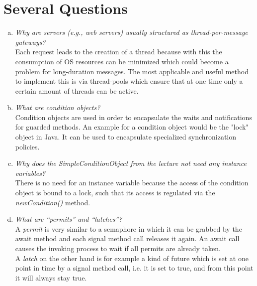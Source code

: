 \documentclass{report}
\author{Marcel \textsc{Zauder} 16-124-836 \\
	Pascal \textsc{Gerig} 16-104-721}
\begin{document}
	\section{Several Questions}
	\startsection
		\begin{enumerate}[a)]
			\item \textit{Why are servers (e.g., web servers) usually structured as thread-per-message gateways?} \\
			Each request leads to the creation of a thread because with this the consumption of OS resources can be minimized which could become a problem for long-duration messages. The most applicable and useful method to implement this is via thread-pools which ensure that at one time only a certain amount of threads can be active.
			\item \textit{What are condition objects?} \\
			Condition objects are used in order to encapsulate the waits and notifications for guarded methods. An example for a condition object would be the "lock" object in Java. It can be used to encapsulate specialized synchronization policies.
			\item \textit{Why does the SimpleConditionObject from the lecture not need any instance variables?} \\
			There is no need for an instance variable because the access of the condition object is bound to a lock, such that its access is regulated via the \textit{newCondition()} method.
			\item \textit{What are “permits” and “latches”?} \\
			A \textit{permit} is very similar to a semaphore in which it can be grabbed by the await method and each signal method call releases it again. An await call causes the invoking process to wait if all permits are already taken. \\
			A \textit{latch} on the other hand is for example a kind of future which is set at one point in time by a signal method call, i.e. it is set to true, and from this point it will always stay true.
		\end{enumerate}
	\closesection
	
\end{document}

